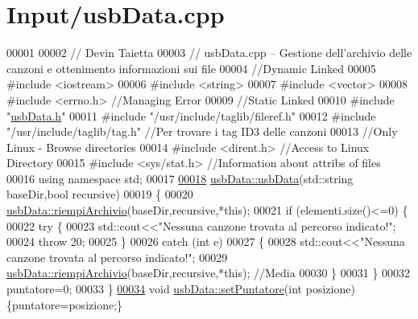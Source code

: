 \hypertarget{usbData_8cpp_source}{\section{\-Input/usb\-Data.cpp}
}

\begin{DoxyCode}
00001 
00002 \textcolor{comment}{// Devin Taietta}
00003 \textcolor{comment}{// usbData.cpp -- Gestione dell'archivio delle canzoni e ottenimento
       informazioni sui file}
00004 \textcolor{comment}{//Dynamic Linked}
00005 \textcolor{preprocessor}{#include <iostream>}
00006 \textcolor{preprocessor}{#include <string>}
00007 \textcolor{preprocessor}{#include <vector>}
00008 \textcolor{preprocessor}{#include <errno.h>}  \textcolor{comment}{//Managing Error}
00009 \textcolor{comment}{//Static Linked}
00010 \textcolor{preprocessor}{#include "\hyperlink{usbData_8h}{usbData.h}"}
00011 \textcolor{preprocessor}{#include "/usr/include/taglib/fileref.h"}
00012 \textcolor{preprocessor}{#include "/usr/include/taglib/tag.h"} \textcolor{comment}{//Per trovare i tag ID3 delle canzoni}
00013 \textcolor{comment}{//Only Linux - Browse directories}
00014 \textcolor{preprocessor}{#include <dirent.h>} \textcolor{comment}{//Access to Linux Directory}
00015 \textcolor{preprocessor}{#include <sys/stat.h>} \textcolor{comment}{//Information about attribs of files}
00016 \textcolor{keyword}{using namespace }std;
00017 
\hypertarget{usbData_8cpp_source_l00018}{}\hyperlink{classusbData_afd7ef352616d15a05bca0e56f46e52a0}{00018} \hyperlink{classusbData_afd7ef352616d15a05bca0e56f46e52a0}{usbData::usbData}(std::string baseDir,\textcolor{keywordtype}{bool} recursive)
00019 \{
00020     \hyperlink{classusbData_ad2e65d4a17a15b8885ae7d78e12aa2db}{usbData::riempiArchivio}(baseDir,recursive,*\textcolor{keyword}{this});
00021     \textcolor{keywordflow}{if} (elementi.size()<=0) \{
00022         \textcolor{keywordflow}{try} \{
00023             std::cout<<\textcolor{stringliteral}{"Nessuna canzone trovata al percorso indicato!"};
00024             \textcolor{keywordflow}{throw} 20;
00025         \}
00026         \textcolor{keywordflow}{catch} (\textcolor{keywordtype}{int} e)
00027         \{
00028             std::cout<<\textcolor{stringliteral}{"Nessuna canzone trovata al percorso indicato!"};
00029             \hyperlink{classusbData_ad2e65d4a17a15b8885ae7d78e12aa2db}{usbData::riempiArchivio}(baseDir,recursive,*\textcolor{keyword}{this}); \textcolor{comment}{//Media}
00030         \}
00031     \}
00032     puntatore=0;
00033 \}
\hypertarget{usbData_8cpp_source_l00034}{}\hyperlink{classusbData_a7fc551ced09d43cb53c94ca9f154c6a9}{00034} \textcolor{keywordtype}{void} \hyperlink{classusbData_a7fc551ced09d43cb53c94ca9f154c6a9}{usbData::setPuntatore}(\textcolor{keywordtype}{int} posizione)\{puntatore=posizione;\}

\end{DoxyCode}

